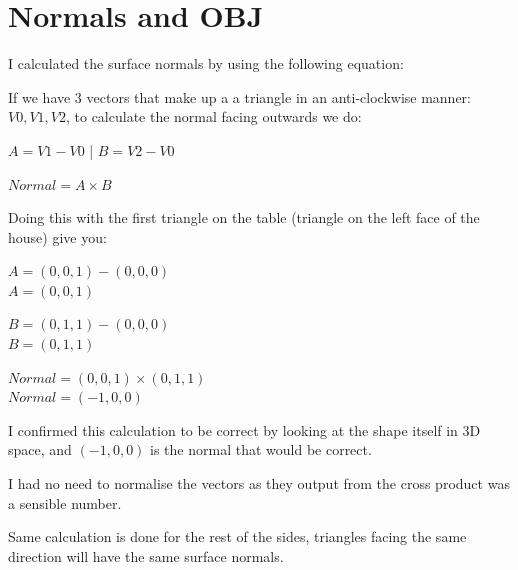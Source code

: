 \documentclass[10pt]{report}
\begin{document}





\section{Normals and OBJ}

I calculated the surface normals by using the following equation:

If we have 3 vectors that make up a a triangle in an anti-clockwise manner: \(V0, V1, V2\), to calculate the normal facing outwards we do:

\(A = V1 - V0\)  |  \(B = V2 - V0\)

\(Normal = A \times B\)

Doing this with the first triangle on the table (triangle on the left face of the house) give you:

\(A = (0, 0, 1) - (0, 0, 0)\) \\ \(A = (0, 0, 1)\)

\(B = (0, 1, 1) - (0, 0, 0)\) \\ \(B = (0, 1, 1)\)

\(Normal = (0, 0, 1) \times (0, 1, 1)\) \\ \(Normal = (-1, 0, 0)\)

I confirmed this calculation to be correct by looking at the shape itself in 3D space, and \((-1, 0, 0)\) is the normal that would be correct.

I had no need to normalise the vectors as they output from the cross product was a sensible number.

Same calculation is done for the rest of the sides, triangles facing the same direction will have the same surface normals.
\end{document}
